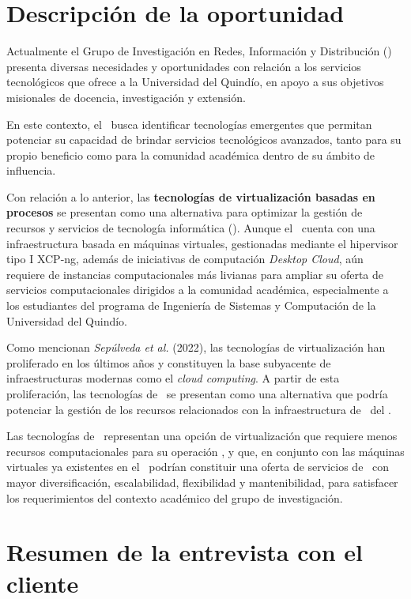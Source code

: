 \section{Descripción de la oportunidad}

Actualmente el Grupo de Investigación en Redes, Información y Distribución (\GRID) presenta diversas necesidades y oportunidades con relación a los servicios tecnológicos que ofrece a la Universidad del Quindío, en apoyo a sus objetivos misionales de docencia, investigación y extensión.

En este contexto, el \GRID\ busca identificar tecnologías emergentes que permitan potenciar su capacidad de brindar servicios tecnológicos avanzados, tanto para su propio beneficio como para la comunidad académica dentro de su ámbito de influencia.

Con relación a lo anterior, las \textbf{tecnologías de virtualización basadas en procesos} se presentan como una alternativa para optimizar la gestión de recursos y servicios de tecnología informática (\TI). Aunque el \GRID\ cuenta con una infraestructura basada en máquinas virtuales, gestionadas mediante el hipervisor tipo I XCP-ng, además de iniciativas de computación \textit{Desktop Cloud}, aún requiere de instancias computacionales más livianas para ampliar su oferta de servicios computacionales dirigidos a la comunidad académica, especialmente a los estudiantes del programa de Ingeniería de Sistemas y Computación de la Universidad del Quindío.

Como mencionan \textit{Sepúlveda et al.} (2022), las tecnologías de virtualización han proliferado en los últimos años y constituyen la base subyacente de infraestructuras modernas como el \textit{cloud computing}. A partir de esta proliferación, las tecnologías de \VBC\ se presentan como una alternativa que podría potenciar la gestión de los recursos relacionados con la infraestructura de \TI\ del \GRID.

Las tecnologías de \VBC\ representan una opción de virtualización que requiere menos recursos computacionales para su operación \citep{Xavier2013}, y que, en conjunto con las máquinas virtuales ya existentes en el \GRID\, podrían constituir una oferta de servicios de \TI\ con mayor diversificación, escalabilidad, flexibilidad y mantenibilidad, para satisfacer los requerimientos del contexto académico del grupo de investigación.

\section{Resumen de la entrevista con el cliente}

